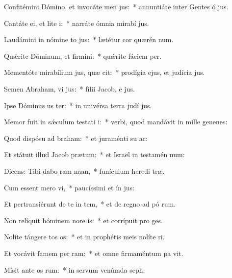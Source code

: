 \item Confitémini Dómino, et invocáte men jus:~* annuntiáte inter Gentes ó jus.
\item Cantáte ei, et lite i:~* narráte ómnia mirabí jus.
\item Laudámini in nómine to jus:~* lætétur cor quærén num.
\item Quǽrite Dóminum, et firmini:~* quǽrite fáciem  per.
\item Mementóte mirabílium jus, quæ cit:~* prodígia ejus, et judícia  jus.
\item Semen Abraham, vi jus:~* fílii Jacob, e jus.
\item Ipse Dóminus us ter:~* in univérsa terra judí jus.
\item Memor fuit in sǽculum testati i:~* verbi, quod mandávit in mille genenes:
\item Quod dispósu ad braham:~* et juraménti su  ac:
\item Et státuit illud Jacob  prætum:~* et Israël in testamén num:
\item Dicens: Tibi dabo ram naan,~* funículum heredi træ.
\item Cum essent mero vi,~* paucíssimi et ín jus:
\item Et pertransiérunt de te in tem,~* et de regno ad pó rum.
\item Non relíquit hóminem nore is:~* et corrípuit pro  ges.
\item Nolíte tángere tos os:~* et in prophétis meis nolíte ri.
\item Et vocávit famem per ram:~* et omne firmaméntum pa vit.
\item Misit ante os rum:~* in servum venúmda  seph.
